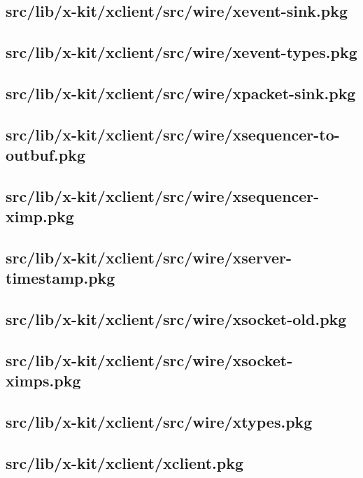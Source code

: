 \subsection{src/lib/x-kit/xclient/src/wire/xevent-sink.pkg}


\subsection{src/lib/x-kit/xclient/src/wire/xevent-types.pkg}


\subsection{src/lib/x-kit/xclient/src/wire/xpacket-sink.pkg}


\subsection{src/lib/x-kit/xclient/src/wire/xsequencer-to-outbuf.pkg}


\subsection{src/lib/x-kit/xclient/src/wire/xsequencer-ximp.pkg}


\subsection{src/lib/x-kit/xclient/src/wire/xserver-timestamp.pkg}


\subsection{src/lib/x-kit/xclient/src/wire/xsocket-old.pkg}


\subsection{src/lib/x-kit/xclient/src/wire/xsocket-ximps.pkg}


\subsection{src/lib/x-kit/xclient/src/wire/xtypes.pkg}


\subsection{src/lib/x-kit/xclient/xclient.pkg}




